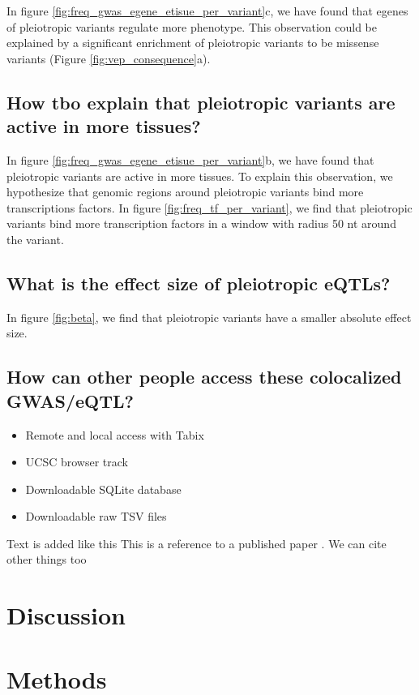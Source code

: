 In figure \ref{fig:freq_gwas_egene_etisue_per_variant}c, we have found that egenes of pleiotropic variants regulate more phenotype.
This observation could be explained by a significant enrichment of pleiotropic variants to be missense variants (Figure \ref{fig:vep_consequence}a).

\subsection*{How tbo explain that pleiotropic variants are active in more tissues?}

In figure \ref{fig:freq_gwas_egene_etisue_per_variant}b, we have found that pleiotropic variants are active in more tissues.
To explain this observation, we hypothesize that genomic regions around pleiotropic variants bind more transcriptions factors.
In figure \ref{fig:freq_tf_per_variant}, we find that pleiotropic variants bind more transcription factors in a window with radius 50 nt around the variant.

\subsection*{What is the effect size of pleiotropic eQTLs?}

In figure \ref{fig:beta}, we find that pleiotropic variants have a smaller absolute effect size.

\subsection*{How can other people access these colocalized GWAS/eQTL?}

\begin{itemize}
  \item Remote and local access with Tabix
  \item UCSC browser track
  \item Downloadable SQLite database
  \item Downloadable raw TSV files
\end{itemize}

Text is added like this
This is a reference to a published paper \citep{2019.Watanabe}.
We can cite other things too \citep{watson_molecular_1953}

\section*{Discussion}

\section*{Methods}\label{sec:methods}

